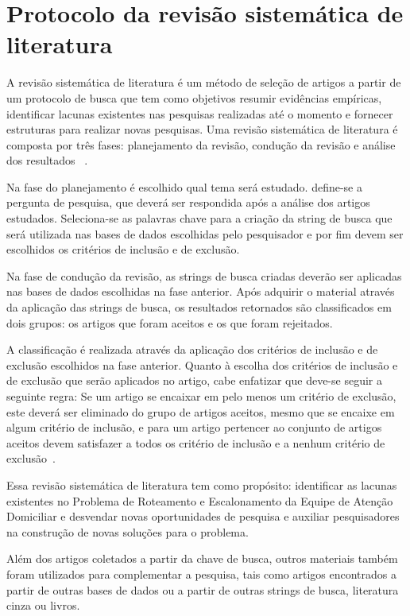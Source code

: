 { }%

\section{Protocolo da revisão sistemática de literatura}

A revisão sistemática de literatura é um método de seleção de artigos a partir de um protocolo de busca que tem como objetivos resumir evidências empíricas, identificar lacunas existentes nas pesquisas realizadas até o momento e fornecer estruturas para realizar novas pesquisas. Uma revisão sistemática de literatura é composta por três fases: planejamento da revisão, condução da revisão e análise dos resultados~ \cite{Kitchenham:2007} .

Na fase do planejamento é escolhido qual tema será estudado. define-se a pergunta de pesquisa, que deverá ser respondida após a análise dos artigos estudados. Seleciona-se as palavras chave para a criação da string de busca que será utilizada nas bases de dados escolhidas pelo pesquisador e por fim devem ser escolhidos os critérios de inclusão e de exclusão.

Na fase de condução da revisão, as strings de busca criadas deverão ser aplicadas nas bases de dados escolhidas na fase anterior.
Após adquirir o material através da aplicação das strings de busca, os resultados retornados são classificados em dois grupos: os artigos que foram aceitos e os que foram rejeitados.

A classificação é realizada através da aplicação dos critérios de inclusão e de exclusão escolhidos na fase anterior.
Quanto à escolha dos critérios de inclusão e de exclusão que serão aplicados no artigo, cabe enfatizar que deve-se seguir a  seguinte regra: Se um artigo se encaixar em pelo menos um critério de exclusão, este deverá ser eliminado do grupo de artigos aceitos, mesmo que se encaixe em algum critério de inclusão, e para um artigo pertencer ao conjunto de artigos aceitos devem satisfazer a todos os critério de inclusão e a nenhum critério de exclusão~\cite{Kitchenham:2007}. 

Essa revisão sistemática de literatura tem como propósito: identificar as lacunas existentes no Problema de Roteamento e Escalonamento da Equipe de Atenção Domiciliar e desvendar novas oportunidades de pesquisa e auxiliar pesquisadores na construção de novas soluções para o problema. 

Além dos artigos coletados a partir da chave de busca, outros materiais também foram utilizados para complementar a pesquisa, tais como artigos encontrados a partir de outras bases de dados ou a partir de outras strings de busca, literatura cinza ou livros.


